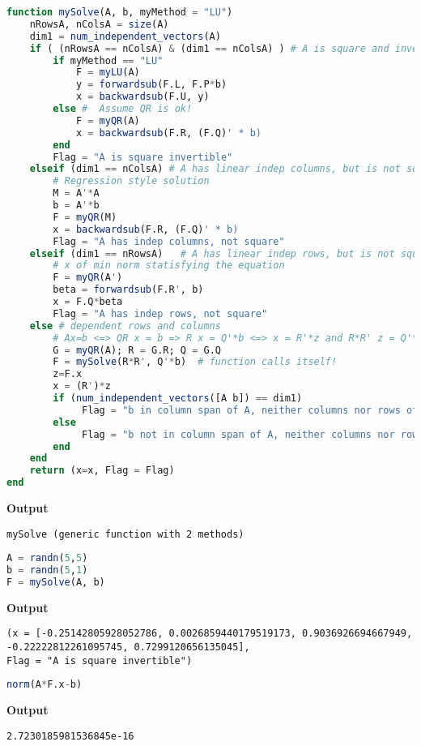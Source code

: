 \begin{lstlisting}[language=Julia,style=mystyle]
function mySolve(A, b, myMethod = "LU")
    nRowsA, nColsA = size(A)
    dim1 = num_independent_vectors(A)
    if ( (nRowsA == nColsA) & (dim1 == nColsA) ) # A is square and invertible
        if myMethod == "LU"
            F = myLU(A)
            y = forwardsub(F.L, F.P*b)
            x = backwardsub(F.U, y)
        else #  Assume QR is ok!
            F = myQR(A)   
            x = backwardsub(F.R, (F.Q)' * b)  
        end
        Flag = "A is square invertible"
    elseif (dim1 == nColsA) # A has linear indep columns, but is not square 
        # Regression style solution
        M = A'*A
        b = A'*b
        F = myQR(M)   
        x = backwardsub(F.R, (F.Q)' * b)
        Flag = "A has indep columns, not square"
    elseif (dim1 == nRowsA)   # A has linear indep rows, but is not square  
        # x of min norm statisfying the equation
        F = myQR(A')   
        beta = forwardsub(F.R', b) 
        x = F.Q*beta
        Flag = "A has indep rows, not square"
    else # dependent rows and columns
        # Ax=b <=> QR x = b => R x = Q'*b <=> x = R'*z and R*R' z = Q'*b
        G = myQR(A); R = G.R; Q = G.Q
        F = mySolve(R*R', Q'*b)  # function calls itself!
        z=F.x 
        x = (R')*z
        if (num_independent_vectors([A b]) == dim1)
             Flag = "b in column span of A, neither columns nor rows of A indep"
        else
             Flag = "b not in column span of A, neither columns nor rows of A indep"
        end
    end
    return (x=x, Flag = Flag)   
end
\end{lstlisting}
\textbf{Output} 
\begin{verbatim}
mySolve (generic function with 2 methods)
\end{verbatim}


\begin{lstlisting}[language=Julia,style=mystyle]
A = randn(5,5)
b = randn(5,1)
F = mySolve(A, b)
\end{lstlisting}
\textbf{Output} 
\begin{verbatim}
(x = [-0.25142805928052786, 0.0026859440179519173, 0.9036926694667949,
-0.22222812261095745, 0.7299120656135045], 
Flag = "A is square invertible")
\end{verbatim}



\begin{lstlisting}[language=Julia,style=mystyle]
norm(A*F.x-b)
\end{lstlisting}
\textbf{Output} 
\begin{verbatim}
2.7230185981536845e-16
\end{verbatim}


